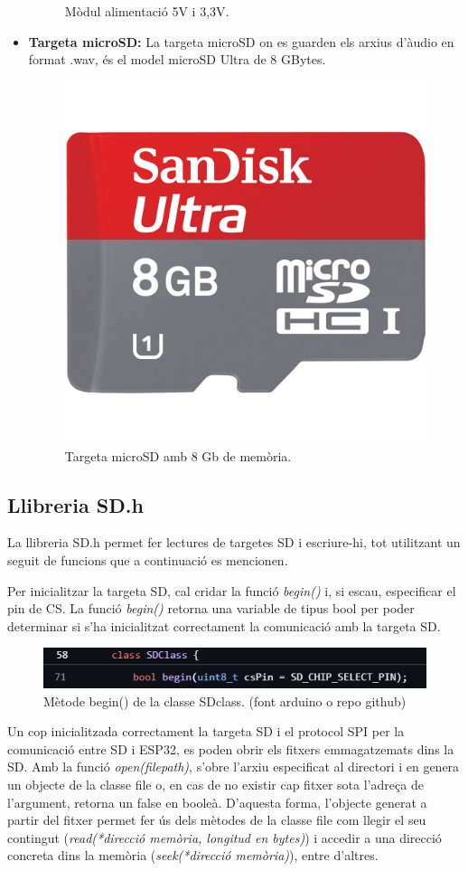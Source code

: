 \begin{itemize}
\begin{figure}[H]
         \caption{Mòdul alimentació 5V i 3,3V.}
         \label{modul_supply_fig}
     \end{figure}
     \item \textbf{Targeta microSD:} La targeta microSD on es guarden els arxius d'àudio en format .wav, és el model microSD Ultra de 8 GBytes.
    \begin{figure}[H]
        \centering
        \includegraphics[width=0.15\linewidth]{Images/microsd_8gb.jpg}
        \caption{Targeta microSD amb 8 Gb de memòria.}
        \label{microSD_fig}
    \end{figure}
 \end{itemize}

\subsection{Llibreria SD.h}
\par La llibreria SD.h permet fer lectures de targetes SD i escriure-hi, tot utilitzant un seguit de funcions que a continuació es mencionen.
\par Per inicialitzar la targeta SD, cal cridar la funció \textit{begin()} i, si escau, especificar el pin de CS. La funció \textit{begin()} retorna una variable de tipus bool per poder determinar si s'ha inicialitzat correctament la comunicació amb la targeta SD.
\begin{figure}[H]
    \centering
    \includegraphics[width=0.5\linewidth]{Images/SD-begin_method.png}
    \caption{Mètode begin() de la classe SDclass. (font arduino o repo github)}
    \label{SD_begin_method_fig}
\end{figure}
\par Un cop inicialitzada correctament la targeta SD i el protocol SPI per la comunicació entre SD i ESP32, es poden obrir els fitxers emmagatzemats dins la SD. Amb la funció \textit{open(filepath)}, s'obre l'arxiu especificat al directori i en genera un objecte de la classe file o, en cas de no existir cap fitxer sota l'adreça de l'argument, retorna un false en booleà. D'aquesta forma, l'objecte generat a partir del fitxer permet fer ús dels mètodes de la classe file com llegir el seu contingut (\textit{read(*direcció memòria, longitud en bytes)}) i accedir a una direcció concreta dins la memòria (\textit{seek(*direcció memòria)}), entre d'altres.\cite{SDarduino}

